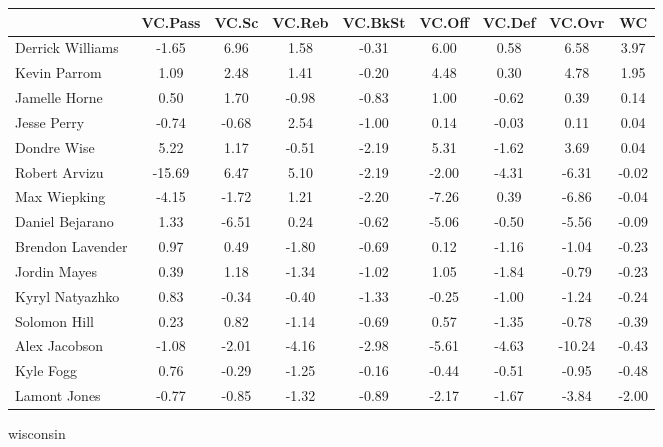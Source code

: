 \documentclass[10pt,letterpaper]{article}
\begin{document}
\begin{table}[ht]
\begin{center}
\begin{tabular}{lcccccccc}
  \hline
 & VC.Pass & VC.Sc & VC.Reb & VC.BkSt & VC.Off & VC.Def & VC.Ovr & WC \\ 
  \hline
Derrick Williams & -1.65 & 6.96 & 1.58 & -0.31 & 6.00 & 0.58 & 6.58 & 3.97 \\ 
  Kevin Parrom & 1.09 & 2.48 & 1.41 & -0.20 & 4.48 & 0.30 & 4.78 & 1.95 \\ 
  Jamelle Horne & 0.50 & 1.70 & -0.98 & -0.83 & 1.00 & -0.62 & 0.39 & 0.14 \\ 
  Jesse Perry & -0.74 & -0.68 & 2.54 & -1.00 & 0.14 & -0.03 & 0.11 & 0.04 \\ 
  Dondre Wise & 5.22 & 1.17 & -0.51 & -2.19 & 5.31 & -1.62 & 3.69 & 0.04 \\ 
  Robert Arvizu & -15.69 & 6.47 & 5.10 & -2.19 & -2.00 & -4.31 & -6.31 & -0.02 \\ 
  Max Wiepking & -4.15 & -1.72 & 1.21 & -2.20 & -7.26 & 0.39 & -6.86 & -0.04 \\ 
  Daniel Bejarano & 1.33 & -6.51 & 0.24 & -0.62 & -5.06 & -0.50 & -5.56 & -0.09 \\ 
  Brendon Lavender & 0.97 & 0.49 & -1.80 & -0.69 & 0.12 & -1.16 & -1.04 & -0.23 \\ 
  Jordin Mayes & 0.39 & 1.18 & -1.34 & -1.02 & 1.05 & -1.84 & -0.79 & -0.23 \\ 
  Kyryl Natyazhko & 0.83 & -0.34 & -0.40 & -1.33 & -0.25 & -1.00 & -1.24 & -0.24 \\ 
  Solomon Hill & 0.23 & 0.82 & -1.14 & -0.69 & 0.57 & -1.35 & -0.78 & -0.39 \\ 
  Alex Jacobson & -1.08 & -2.01 & -4.16 & -2.98 & -5.61 & -4.63 & -10.24 & -0.43 \\ 
  Kyle Fogg & 0.76 & -0.29 & -1.25 & -0.16 & -0.44 & -0.51 & -0.95 & -0.48 \\ 
  Lamont Jones & -0.77 & -0.85 & -1.32 & -0.89 & -2.17 & -1.67 & -3.84 & -2.00 \\ 
   \hline
\end{tabular}
\end{center}
\end{table}
\newpage
\begin{center}
wisconsin 
\end{center}
\end{document}
